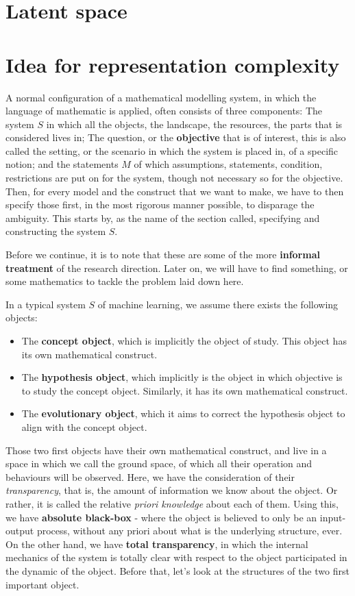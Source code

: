 \documentclass[twoside,10pt]{article}
\begin{document}
\section{Latent space}

\section{Idea for representation complexity}
A normal configuration of a mathematical modelling system, in which the language of mathematic is applied, often consists of three components: The system $S$ in which all the objects, the landscape, the resources, the parts that is considered lives in; The question, or the \textbf{objective} that is of interest, this is also called the setting, or the scenario in which the system is placed in, of a specific notion; and the statements $M$ of which assumptions, statements, condition, restrictions are put on for the system, though not necessary so for the objective. Then, for every model and the construct that we want to make, we have to then specify those first, in the most rigorous manner possible, to disparage the ambiguity. This starts by, as the name of the section called, specifying and constructing the system $S$. 

Before we continue, it is to note that these are some of the more \textbf{informal treatment} of the research direction. Later on, we will have to find something, or some mathematics to tackle the problem laid down here. 

In a typical system $S$ of machine learning, we assume there exists the following objects: 

\begin{itemize}[topsep=1pt,itemsep=0.5pt]
    \item The \textbf{concept object}, which is implicitly the object of study. This object has its own mathematical construct. 
    \item The \textbf{hypothesis object}, which implicitly is the object in which objective is to study the concept object. Similarly, it has its own mathematical construct. 
    \item The \textbf{evolutionary object}, which it aims to correct the hypothesis object to align with the concept object. 
\end{itemize}
Those two first objects have their own mathematical construct, and live in a space in which we call the ground space, of which all their operation and behaviours will be observed. Here, we have the consideration of their \textit{transparency}, that is, the amount of information we know about the object. Or rather, it is called the relative \textit{priori knowledge} about each of them. Using this, we have \textbf{absolute black-box} - where the object is believed to only be an input-output process, without any priori about what is the underlying structure, ever. On the other hand, we have \textbf{total transparency}, in which the internal mechanics of the system is totally clear with respect to the object participated in the dynamic of the object. Before that, let's look at the structures of the two first important object. 
\end{document}
